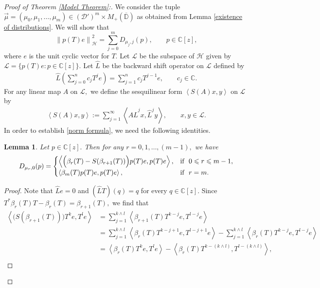 \documentclass[10pt,oneside,reqno]{amsart}
\newtheorem{lemma}[theorem]{Lemma}
\theoremstyle{definition}
\theoremstyle{remark}
\newcommand{\calH}{{\mathcal{H}}}
\newcommand{\ip}[1]{\left\langle #1 \right\rangle}
\newcommand{\norm}[1]{\left\lVert #1 \right\rVert}
\newcommand{\D}{\mathbb D}
\numberwithin{equation}{section}
\begin{document}
\begin{proof}[Proof of Theorem \ref{Model Theorem}:]
We consider the tuple $\overrightarrow{\mu} = \left( \mu_{0}, \mu_{1}, \ldots , \mu_{m} \right) \in (\mathcal D')^{m}\times M_+(\overline{\D})$ as obtained from Lemma \ref{existence of distributions}. We will show that
    \begin{equation}\label{norm formula}
	\norm{p\left( T \right) e}_{\calH}^{2}= \sum_{j=0}^{m} D_{\mu_{j} , j} \left( p \right),\qquad p\in \mathbb C[z],
    \end{equation}
where $e$ is the unit cyclic vector for $T.$ Let $\mathcal L$ be the subspace of $\calH$ given by $\mathcal L= \{p(T)e: p\in \mathbb C[z]\}.$ Let $\hat{L}$ be the backward shift operator on $\mathcal L$ defined by 
\begin{align*}
    \hat{L}\left (\sum\limits_{j=0}^nc_jT^je \right )= \sum\limits_{j=1}^nc_jT^{j-1}e,\qquad c_j\in\mathbb C.
\end{align*}
For any linear map $A$ on $ \mathcal L,$ we define the sesquilinear form $\ip{S(A)x,y}$ on $\mathcal L$ by
\begin{align*}
  \ip{S(A)x,y}:= \sum\limits_{j=1}^{\infty} \ip{A \hat{L}^jx,\hat{L}^jy},\qquad x,y\in \mathcal L.
\end{align*}
In order to establish \eqref{norm formula}, we need the following identities. 
\begin{lemma}\label{moment through diff}
Let $p\in\mathbb C[z].$ Then for any $r=0,1,\ldots,(m-1),$ we have
\begin{align*}
   D_{{\mu_r},0}(p) = \begin{cases}
       \ip{\Big(\beta_r(T)-S(\beta_{r+1}(T))\Big)p(T)e,p(T)e}, & \mbox{if\,\,}\,\, 0\leqslant r \leqslant m-1,\\
       \ip{\beta_m(T) p(T)e, p(T)e}, & \mbox{if\,\,}\,\, r =m.
   \end{cases}
\end{align*}
\end{lemma}
\begin{proof}
Note that $\hat{L}e=0$ and $(\hat{L}T)(q)=q$ for every $q\in \mathbb C[z].$ Since $T^*\beta_{r}(T)T-\beta_r(T)=\beta_{r+1}(T),$  we find that  
\begin{align*}
        \ip{\Big (S(\beta_{r+1}(T))\Big) T^ke,T^le}  &=   \sum\limits_{j=1}^{k\wedge l} \ip{\beta_{r+1}(T) T^{k-j}e,T^{l-j}e}\\
        &= \sum\limits_{j=1}^{k\wedge l} \ip{\beta_{r}(T) T^{k-j+1}e,T^{l-j+1}e} - \sum\limits_{j=1}^{k\wedge l} \ip{\beta_{r}(T) T^{k-j}e,T^{l-j}e}\\
        &= \ip{\beta_r(T)T^{k}e,T^le}- \ip{\beta_r(T) T^{k- (k\wedge l)}, T^{l- (k\wedge l)}},\\

\end{align*}
\end{proof}
\end{proof}
\end{document}
